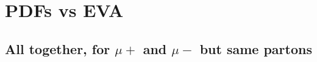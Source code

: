 \documentclass[a4paper,11pt]{article}
\begin{document}




\clearpage
\section{PDFs vs EVA}

\subsection{All together, for $\mu+$ and $\mu-$ but same partons}



\end{document}
